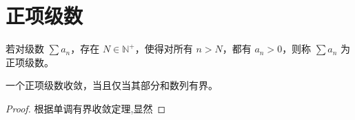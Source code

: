 \section{正项级数}
\begin{definition}
	若对级数 $\sum a_n$，存在 $N \in \mathbb{N}^+$，使得对所有 $n > N$，都有 $a_n > 0$，则称 $\sum a_n$ 为正项级数。
\end{definition}
\begin{proposition}
	一个正项级数收敛，当且仅当其部分和数列有界。
\end{proposition}
\begin{proof}
	根据单调有界收敛定理,显然
\end{proof}

